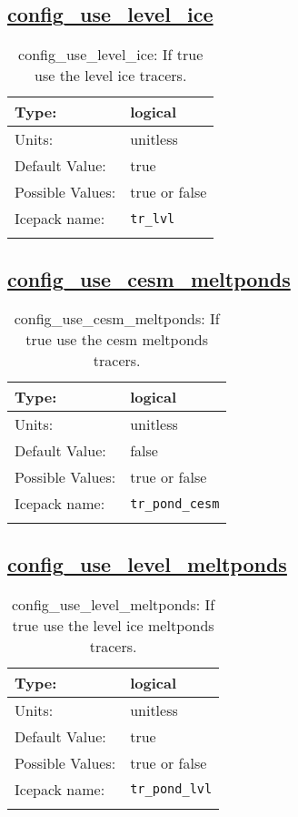 \subsection[config\_use\_level\_ice]{\hyperref[sec:nm_tab_column_tracers]{config\_use\_level\_ice}}
\label{subsec:nm_sec_config_use_level_ice}
\begin{center}
\begin{longtable}{| p{2.0in} || p{4.0in} |}
    \hline
    Type: & logical \\
    \hline
    Units: & \si{unitless} \\
    \hline
    Default Value: & true \\
    \hline
    Possible Values: & true or false \\
    \hline
    Icepack name: & \verb+tr_lvl+ \\
    \hline
    \caption{config\_use\_level\_ice: If true use the level ice tracers.}
\end{longtable}
\end{center}
\subsection[config\_use\_cesm\_meltponds]{\hyperref[sec:nm_tab_column_tracers]{config\_use\_cesm\_meltponds}}
\label{subsec:nm_sec_config_use_cesm_meltponds}
\begin{center}
\begin{longtable}{| p{2.0in} || p{4.0in} |}
    \hline
    Type: & logical \\
    \hline
    Units: & \si{unitless} \\
    \hline
    Default Value: & false \\
    \hline
    Possible Values: & true or false \\
    \hline
    Icepack name: & \verb+tr_pond_cesm+ \\
    \hline
    \caption{config\_use\_cesm\_meltponds: If true use the cesm meltponds tracers.}
\end{longtable}
\end{center}
\subsection[config\_use\_level\_meltponds]{\hyperref[sec:nm_tab_column_tracers]{config\_use\_level\_meltponds}}
\label{subsec:nm_sec_config_use_level_meltponds}
\begin{center}
\begin{longtable}{| p{2.0in} || p{4.0in} |}
    \hline
    Type: & logical \\
    \hline
    Units: & \si{unitless} \\
    \hline
    Default Value: & true \\
    \hline
    Possible Values: & true or false \\
    \hline
    Icepack name: & \verb+tr_pond_lvl+ \\
    \hline
    \caption{config\_use\_level\_meltponds: If true use the level ice meltponds tracers.}
\end{longtable}
\end{center}
